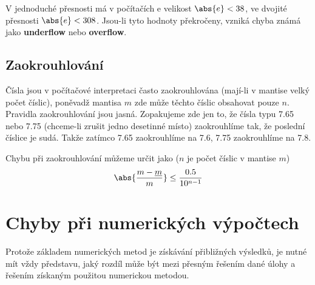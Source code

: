     V jednoduché přesnosti má v počítačích e velikost \(\abs{e}< 38\), ve dvojité přesnosti
    \(\abs{e}<308\). Jsou-li tyto hodnoty překročeny, vzniká chyba známá jako \textbf{underflow}
    nebo \textbf{overflow}.
  
    \subsection{Zaokrouhlování}
      Čísla jsou v počítačové interpretaci často zaokrouhlována (mají-li v mantise velký počet
      číslic), poněvadž mantisa $m$ zde může těchto číslic obsahovat pouze $n$. Pravidla
      zaokrouhlování jsou jasná. Zopakujeme zde jen to, že čísla typu 7.65 nebo 7.75 (chceme-li
      zrušit jedno desetinné místo) zaokrouhlíme tak, že poslední číslice je sudá. Takže zatímco 
      7.65 zaokrouhlíme na 7.6, 7.75 zaokrouhlíme na 7.8.
  
      Chybu při zaokrouhlování můžeme určit jako ($n$ je počet číslic v mantise $m$)
      \begin{equation}\label{nm:eq_err_round}
        \abs{\frac{m-\underline{m}}{m}} \leq \frac{0.5}{10^{n-1}}
      \end{equation}  
  
  \section{Chyby při numerických výpočtech}
    Protože základem numerických metod je získávání přibližných výsledků, je nutné mít vždy
    představu, jaký rozdíl může být mezi přesným řešením dané úlohy a řešením získaným použitou
    numerickou metodou.
